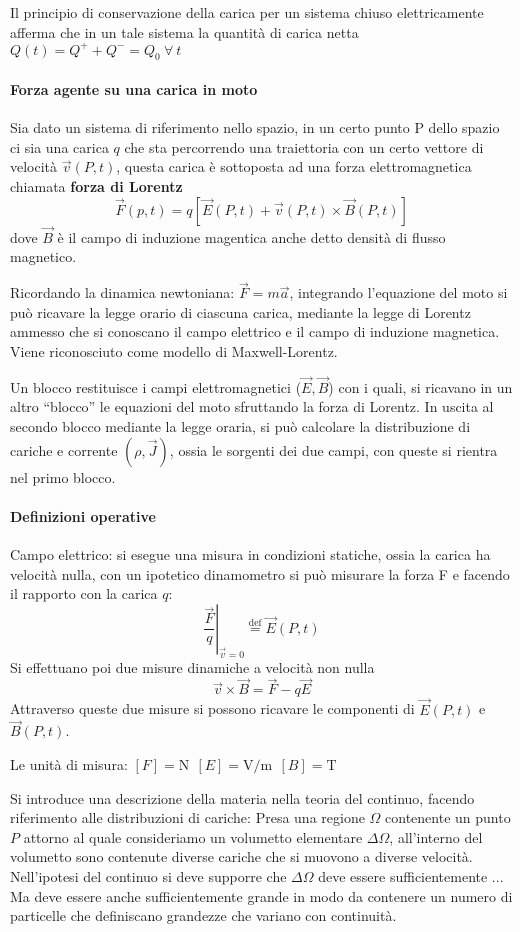 Il principio di conservazione della carica per un sistema chiuso elettricamente afferma che in un tale 
sistema la quantità di carica netta $Q(t) = Q^+ + Q^- = Q_0\ \forall\ t$

\paragraph{Forza agente su una carica in moto}

Sia dato un sistema di riferimento nello spazio, in un certo punto P dello spazio ci sia una carica $q$
che sta percorrendo una traiettoria con un certo vettore di velocità $\vec{v}(P,t)$, questa
carica è sottoposta ad una forza elettromagnetica chiamata \textbf{forza di Lorentz}
$$
\vec{F}(p,t) = q\left[\vec{E}(P,t)+\vec{v}(P,t)\times\vec{B}(P,t)\right]
$$
dove $\vec{B}$ è il campo di induzione magentica anche detto densità di flusso magnetico.

Ricordando la dinamica newtoniana: $\vec{F} = m\vec{a}$, integrando l'equazione del moto si può
ricavare la legge orario di ciascuna carica, mediante la legge di Lorentz ammesso che si conoscano 
il campo elettrico e il campo di induzione magnetica.
Viene riconosciuto come modello di Maxwell-Lorentz.

Un blocco restituisce i campi elettromagnetici ($\vec{E},\vec{B}$) con i quali, si ricavano in un altro
``blocco'' le equazioni del moto sfruttando la forza di Lorentz.
In uscita al secondo blocco mediante la legge oraria, si può calcolare la distribuzione di cariche e 
corrente $\left(\rho,\vec{J}\right)$, ossia le sorgenti dei due campi, con queste si rientra nel primo blocco.

\paragraph{Definizioni operative}
Campo elettrico:
si esegue una misura in condizioni statiche, ossia la carica ha velocità nulla, con un ipotetico 
dinamometro si può misurare la forza F e facendo il rapporto con la carica $q$:
$$
\left.\frac{\vec{F}}{q}\right|_{\vec{v}=0} \stackrel{\text{def}}{=} \vec{E}(P,t)
$$
Si effettuano poi due misure dinamiche a velocità non nulla
$$
\vec{v}\times\vec{B} = \vec{F} - q\vec{E}
$$
Attraverso queste due misure si possono ricavare le componenti di $\vec{E}(P,t)$ e $\vec{B}(P,t)$.


Le unità di misura:
$[F] = \si{\newton}\ \  [E] = \si{\volt\per\meter} \ \ [B] = \si{\tesla}$

Si introduce una descrizione della materia nella teoria del continuo, facendo riferimento alle 
distribuzioni di cariche:
Presa una regione $\Omega$ contenente un punto $P$ attorno al quale consideriamo un volumetto elementare 
$\Delta\Omega$, all'interno del volumetto sono contenute diverse cariche che si muovono a diverse 
velocità. Nell'ipotesi del continuo si deve supporre che $\Delta \Omega$ deve essere sufficientemente ...
Ma deve essere anche sufficientemente grande in modo da contenere un numero di particelle che definiscano
grandezze che variano con continuità.

